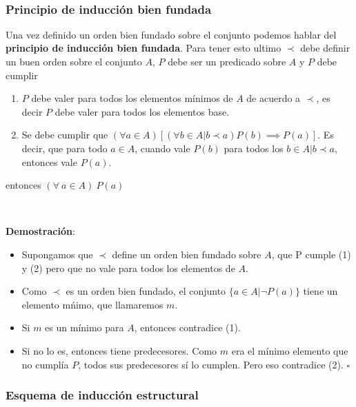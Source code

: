 ~

\subsubsection{Principio de inducci\'on bien fundada}

Una vez definido un orden bien fundado sobre el conjunto podemos hablar del \textbf{principio de inducci\'on bien fundada}. Para tener esto ultimo $\prec$ debe definir un buen orden sobre el conjunto $A$, $P$ debe ser un predicado sobre $A$ y $P$ debe cumplir

\begin{enumerate}
 \item $P$ debe valer para todos los elementos m\'inimos de $A$ de acuerdo a $\prec$, es decir $P$ debe valer para todos los elementos base.
 \item Se debe cumplir que $(\forall a\in A)[(\forall b \in A | b \prec a) P(b) \implies P(a)]$. Es decir, que para todo $a \in A$, cuando vale $P(b)$ para todos los $b \in A | b \prec a$, entonces vale $P(a)$.
\end{enumerate}

entonces $(\forall\ a \in A)\ P(a)$

~

\textbf{Demostraci\'on}:
\begin{itemize}
 \item Supongamos que $\prec$ define un orden bien fundado sobre $A$, que P cumple (1) y (2) pero que no vale para todos los elementos de $A$.
 \item Como $\prec$ es un orden bien fundado, el conjunto $\{a \in A | \lnot P(a)\}$ tiene un elemento m\'nimo, que llamaremos $m$.
 \item Si $m$ es un m\'inimo para $A$, entonces contradice (1).
 \item Si no lo es, entonces tiene predecesores. Como $m$ era el m\'inimo elemento que no cumpl\'ia $P$, todos sus predecesores s\'i lo cumplen. Pero eso contradice (2). $\square$
\end{itemize}


\subsubsection{Esquema de inducci\'on estructural}

